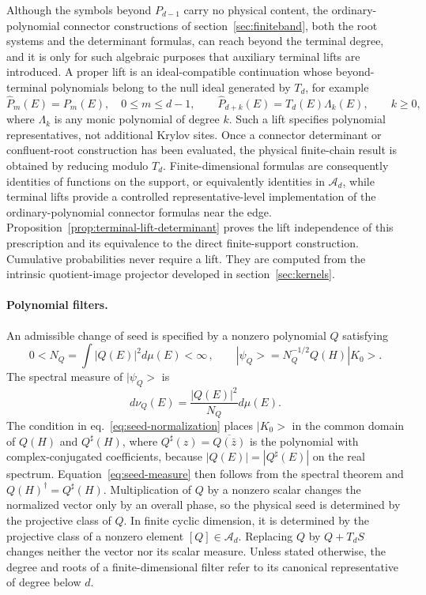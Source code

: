 \documentclass[a4paper,11pt]{article}
\def\ket#1{|#1>}%
\def\dd{d}%
\theoremstyle{definition}
\theoremstyle{remark}
\newcommand{\ket}[1]{|#1\rangle}
\newcommand{\dd}{\mathrm d}
\newcommand{\cA}{\mathcal A}
\newcommand{\Qsh}{Q^{\sharp}}
\begin{document}
Although the symbols beyond $P_{d-1}$ carry no physical content, the ordinary-polynomial connector constructions of section~\ref{sec:finiteband}, both the root systems and the determinant formulas, can reach beyond the terminal degree, and it is only for such algebraic purposes that auxiliary terminal lifts are introduced. A proper lift is an ideal-compatible continuation whose beyond-terminal polynomials belong to the null ideal generated by $T_d$, for example
\begin{equation}
   \widehat P_m(E)=P_m(E),\quad 0\le m\le d-1,
   \qquad
   \widehat P_{d+k}(E)=T_d(E)\Lambda_k(E),\qquad k\ge0,
   \label{eq:proper-terminal-lift-main}
\end{equation}
where $\Lambda_k$ is any monic polynomial of degree $k$. Such a lift specifies polynomial representatives, not additional Krylov sites. Once a connector determinant or confluent-root construction has been evaluated, the physical finite-chain result is obtained by reducing modulo $T_d$. Finite-dimensional formulas are consequently identities of functions on the support, or equivalently identities in $\cA_d$, while terminal lifts provide a controlled representative-level implementation of the ordinary-polynomial connector formulas near the edge. Proposition~\ref{prop:terminal-lift-determinant} proves the lift independence of this prescription and its equivalence to the direct finite-support construction. Cumulative probabilities never require a lift. They are computed from the intrinsic quotient-image projector developed in section~\ref{sec:kernels}.

\paragraph{Polynomial filters.}
An admissible change of seed is specified by a nonzero polynomial $Q$ satisfying
\begin{equation}
   0<N_Q=\int |Q(E)|^2\dd\mu(E)<\infty\,,
   \qquad
   \ket{\psi_Q}=N_Q^{-1/2}Q(H)\ket{K_0}.
   \label{eq:seed-normalization}
\end{equation}
The spectral measure of $\ket{\psi_Q}$ is
\begin{equation}
   \dd\nu_Q(E)=\frac{|Q(E)|^2}{N_Q}\dd\mu(E).
   \label{eq:seed-measure}
\end{equation}
The condition in eq.~\eqref{eq:seed-normalization} places $\ket{K_0}$ in
the common domain of $Q(H)$ and $\Qsh(H)$, where $\Qsh(z)=\overline{Q(\bar z)}$ is the
polynomial with complex-conjugated coefficients, because
$|Q(E)|=|\Qsh(E)|$ on the real spectrum.  Equation~\eqref{eq:seed-measure}
then follows from the spectral theorem and
$Q(H)^\dagger=\Qsh(H)$. Multiplication of $Q$ by a nonzero scalar changes the normalized vector only by an overall phase, so the physical seed is determined by the projective class of $Q$. In finite cyclic dimension, it is determined by the projective class of a nonzero element $[Q]\in\cA_d$. Replacing $Q$ by $Q+T_dS$ changes neither the vector nor its scalar measure. Unless stated otherwise, the degree and roots of a finite-dimensional filter refer to its canonical representative of degree below $d$.
\end{document}
